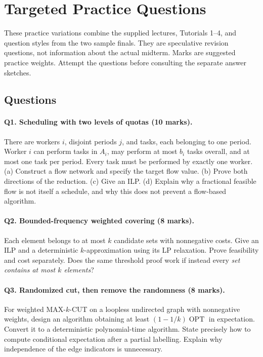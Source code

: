 \documentclass[10pt]{article}
\theoremstyle{definition}
\newcommand{\OPT}{\operatorname{OPT}}
\begin{document}
\clearpage
\section{Targeted Practice Questions}\label{prac:questions}\label{prac:main}
These practice variations combine the supplied lectures, Tutorials 1--4,
and question styles from the two sample finals.  They are speculative
revision questions, not information about the actual midterm.  Marks are
suggested practice weights.  Attempt the questions before consulting the
separate answer sketches.

\subsection{Questions}
\paragraph{Q1. Scheduling with two levels of quotas (10 marks).}
There are workers $i$, disjoint periods $j$, and tasks, each belonging to
one period.  Worker $i$ can perform tasks in $A_i$, may perform at most
$b_i$ tasks overall, and at most one task per period.  Every task must be
performed by exactly one worker.
(a) Construct a flow network and specify the target flow value.
(b) Prove both directions of the reduction.  (c) Give an ILP.
(d) Explain why a fractional feasible flow is not itself a schedule, and
why this does not prevent a flow-based algorithm.

\paragraph{Q2. Bounded-frequency weighted covering (8 marks).}
Each element belongs to at most $k$ candidate sets with nonnegative costs.
Give an ILP and a deterministic $k$-approximation using its LP relaxation.
Prove feasibility and cost separately.  Does the same threshold proof work
if instead every \emph{set contains at most $k$ elements}?

\paragraph{Q3. Randomized cut, then remove the randomness (8 marks).}
For weighted MAX-$k$-CUT on a loopless undirected graph with nonnegative
weights, design an algorithm obtaining at least $(1-1/k)\OPT$ in expectation.
Convert it to a deterministic polynomial-time algorithm.  State precisely
how to compute conditional expectation after a partial labelling.  Explain
why independence of the edge indicators is unnecessary.
\end{document}
